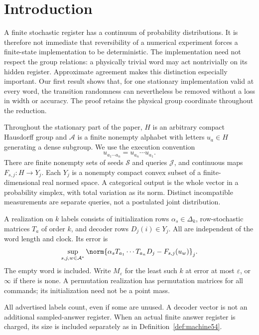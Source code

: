 \section{Introduction}
A finite stochastic register has a continuum of probability distributions. It is therefore not immediate that reversibility of a numerical experiment forces a finite-state implementation to be deterministic. The implementation need not respect the group relations: a physically trivial word may act nontrivially on its hidden register. Approximate agreement makes this distinction especially important. Our first result shows that, for one stationary implementation valid at every word, the transition randomness can nevertheless be removed without a loss in width or accuracy. The proof retains the physical group coordinate throughout the reduction.

Throughout the stationary part of the paper, $H$ is an arbitrary compact Hausdorff group and $\mathcal A$ is a finite nonempty alphabet with letters $u_a\in H$ generating a dense subgroup. We use the execution convention
\[
             u_{a_1\cdots a_n}=u_{a_n}\cdots u_{a_1}.
\]
There are finite nonempty sets of seeds $\mathcal S$ and queries $\mathcal J$, and continuous maps $F_{s,j}:H\to Y_j$. Each $Y_j$ is a nonempty compact convex subset of a finite-dimensional real normed space. A categorical output is the whole vector in a probability simplex, with total variation as its norm. Distinct incompatible measurements are separate queries, not a postulated joint distribution.

\begin{definition}\label{def:stationary55}
A realization on $k$ labels consists of initialization rows $\alpha_s\in\Delta_k$, row-stochastic matrices $T_a$ of order $k$, and decoder rows $D_j(i)\in Y_j$. All are independent of the word length and clock. Its error is
\[
 \sup_{s,j,w\in\mathcal A^*}
 \norm{\alpha_sT_{a_1}\cdots T_{a_n}D_j-F_{s,j}(u_w)}_j.
\]
The empty word is included. Write $M_\varepsilon$ for the least such $k$ at error at most $\varepsilon$, or $\infty$ if there is none. A permutation realization has permutation matrices for all commands; its initialization need not be a point mass.
\end{definition}
All advertised labels count, even if some are unused. A decoder vector is not an additional sampled-answer register. When an actual finite answer register is charged, its size is included separately as in Definition~\ref{def:machine54}.

